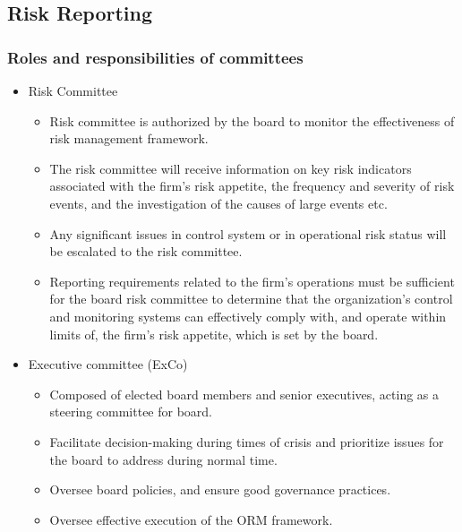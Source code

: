 \subsection{Risk Reporting}





\subsubsection{Roles and responsibilities of committees}
\begin{itemize}
\item Risk Committee
    \begin{itemize}
    \item Risk committee is authorized by the board to monitor the effectiveness of risk management framework.
    \item  The risk committee will receive information on key risk indicators associated with the firm's risk appetite, the frequency and severity of risk events, and the investigation of the causes of large events etc.
    \item  Any significant issues in control system or in operational risk status will be escalated to the risk committee.
    \item Reporting requirements related to the firm's operations must be sufficient for the board risk committee to determine that the organization's control and monitoring systems can effectively comply with, and operate within limits of, the firm's risk appetite, which is set by the board.
    
    \end{itemize}
\item Executive committee (ExCo)
    \begin{itemize}
    \item Composed of elected board members and senior executives, acting as a steering committee for board.
    \item  Facilitate decision-making during times of crisis and prioritize issues for the board to address during normal time.
    \item  Oversee board policies, and ensure good governance practices.
    \item  Oversee effective execution of the ORM framework. 
    \end{itemize}
    

\end{itemize}
